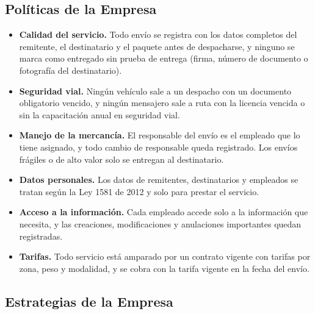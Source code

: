\subsection{Políticas de la Empresa}

\begin{itemize}[leftmargin=1.2cm,itemsep=2pt]
  \item \textbf{Calidad del servicio.} Todo envío se registra con los
        datos completos del remitente, el destinatario y el paquete
        antes de despacharse, y ninguno se marca como entregado sin
        prueba de entrega (firma, número de documento o fotografía del
        destinatario).
  \item \textbf{Seguridad vial.} Ningún vehículo sale a un despacho con
        un documento obligatorio vencido, y ningún mensajero sale a ruta
        con la licencia vencida o sin la capacitación anual en seguridad
        vial.
  \item \textbf{Manejo de la mercancía.} El responsable del envío es el
        empleado que lo tiene asignado, y todo cambio de responsable
        queda registrado. Los envíos frágiles o de alto valor solo se
        entregan al destinatario.
  \item \textbf{Datos personales.} Los datos de remitentes,
        destinatarios y empleados se tratan según la Ley 1581 de 2012 y
        solo para prestar el servicio.
  \item \textbf{Acceso a la información.} Cada empleado accede solo a la
        información que necesita, y las creaciones, modificaciones y
        anulaciones importantes quedan registradas.
  \item \textbf{Tarifas.} Todo servicio está amparado por un contrato
        vigente con tarifas por zona, peso y modalidad, y se cobra con
        la tarifa vigente en la fecha del envío.
\end{itemize}

\subsection{Estrategias de la Empresa}

